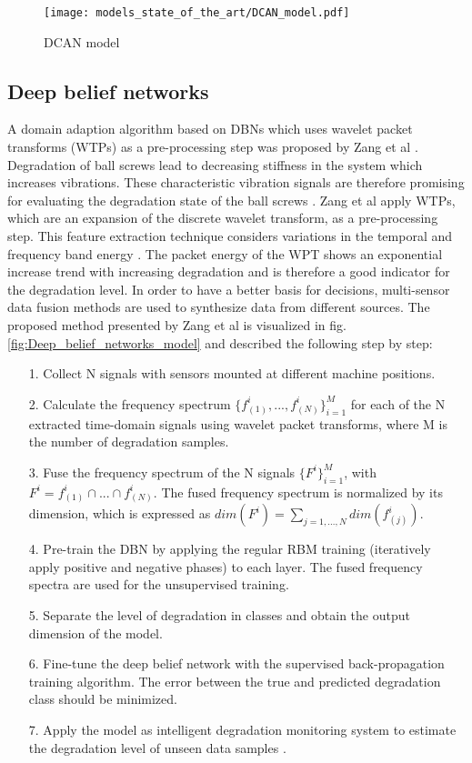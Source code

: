 {\begin{figure}[p]
  \centering
  \texttt{[image: models\_state\_of\_the\_art/DCAN\_model.pdf]}
  \caption{DCAN model \cite{li2020}}
  \label{fig:DCAN_model}
\end{figure}

\subsection{Deep belief networks}
A domain adaption algorithm based on DBNs which uses wavelet packet transforms (WTPs) as a pre-processing step was proposed by Zang et al \cite{Zhang2017}. Degradation of ball screws lead to decreasing stiffness in the system which increases vibrations. These characteristic vibration signals are therefore promising for evaluating the degradation state of the ball screws \cite{Zhang2017}. Zang et al apply WTPs, which are an expansion of the discrete wavelet transform, as a pre-processing step. This feature extraction technique considers variations in the temporal and frequency band energy \cite{Besbes2016}. The packet energy of the WPT shows an exponential increase trend with increasing degradation and is therefore a good indicator for the degradation level. In order to have a better basis for decisions, multi-sensor data fusion methods are used to synthesize data from different sources. The proposed method presented by Zang et al is visualized in fig. \ref{fig:Deep_belief_networks_model} and described the following step by step:

\begin{itemize}
    \item [1.] Collect N signals with sensors mounted at different machine positions.
    \item [2.] Calculate the frequency spectrum $\{f_{(1)}^{i}, ..., f_{(N)}^{i}\}_{i=1}^{M}$ for each of the N extracted time-domain signals using wavelet packet transforms, where M is the number of degradation samples.
    \item [3.] Fuse the frequency spectrum of the N signals $\{F^{i}\}_{i=1}^{M}$, with $F^{i}=f_{(1)}^{i} \cap ... \cap f_{(N)}^{i}$. The fused frequency spectrum is normalized by its dimension, which is expressed as $dim(F^{i})=\sum_{j=1,...,N} dim(f_{(j)}^{i})$.
    \item [4.] Pre-train the DBN by applying the regular RBM training (iteratively apply positive and negative phases) to each layer. The fused frequency spectra are used for the unsupervised training. 
    \item [5.] Separate the level of degradation in classes and obtain the output dimension of the model.
    \item [6.]  Fine-tune the deep belief network with the supervised back-propagation training algorithm. The error between the true and predicted degradation class should be minimized.
    \item [7.] Apply the model as intelligent degradation monitoring system to estimate the degradation level of unseen data samples \cite{Zhang2017}.
\end{itemize}

}
